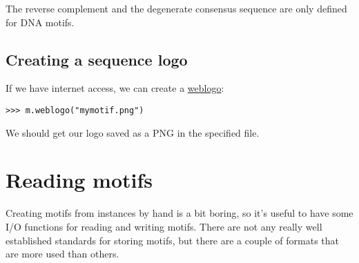 \documentclass{report}
\begin{document}
The reverse complement and the degenerate consensus sequence are
only defined for DNA motifs.

\subsection{Creating a sequence logo}
If we have internet access, we can create a \href{http://weblogo.berkeley.edu}{weblogo}:
\begin{verbatim}
>>> m.weblogo("mymotif.png")
\end{verbatim}
We should get our logo saved as a PNG in the specified file.

\section{Reading motifs}
\label{sec:io}

Creating motifs from instances by hand is a bit boring, so it's
useful to have some I/O functions for reading and writing
motifs. There are not any really well established standards for storing
motifs, but there are a couple of formats that are more used than
others.
\end{document}
